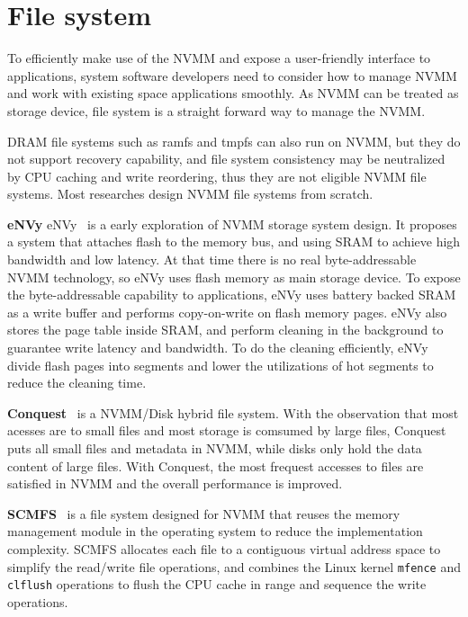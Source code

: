 \section{File system} 
\label{sec:fs}

To efficiently make use of the NVMM and expose a user-friendly
interface to applications, system software developers need to consider
how to manage NVMM and work with existing space applications smoothly.
As NVMM can be treated as storage device, file system is a straight forward
way to manage the NVMM.

DRAM file systems such as ramfs and tmpfs can also run on NVMM, but they
do not support recovery capability, and file system consistency may be 
neutralized by
CPU caching and write reordering, thus they are not eligible NVMM file systems.
Most researches design NVMM file systems from scratch. 

\textbf{eNVy} eNVy~\cite{eNVy} is a early exploration of NVMM storage system
design. It proposes a system that attaches flash to the memory
bus, and using SRAM to achieve high bandwidth and low latency. At that time
there is no real byte-addressable NVMM technology, so eNVy uses flash memory
as main storage device. To expose the byte-addressable capability to 
applications, eNVy uses battery backed SRAM as a write buffer and performs
copy-on-write on flash memory pages. eNVy also stores the page table inside
SRAM, and perform cleaning in the background to guarantee write latency and
bandwidth. To do the cleaning efficiently, eNVy divide flash pages into
segments and lower the utilizations of hot segments to reduce the cleaning
time.


\textbf{Conquest}~\cite{conquest} is a NVMM/Disk hybrid file system.
With the observation that most acesses are to small files and most storage is
comsumed by large files, Conquest puts all small files and metadata in NVMM,
while disks only hold the data content of large files. With Conquest, the most
frequest accesses to files are satisfied in NVMM and the overall performance is
improved.

\textbf{SCMFS}~\cite{scmfs} is a file system designed for NVMM that
reuses the memory
management module in the operating system to reduce the implementation
complexity. SCMFS allocates 
each file to a contiguous virtual address space
to simplify the read/write file operations, and combines the Linux kernel
\texttt{mfence} and \texttt{clflush} operations to flush the CPU cache in
range and sequence the write operations.

